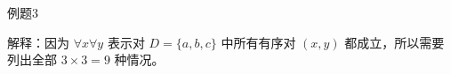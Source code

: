 \begin{question}{例题3}
\begin{enumerate}
	解释：因为 \(\forall x\forall y\) 表示对 \(D=\{a,b,c\}\) 中所有有序对 \((x,y)\) 都成立，所以需要列出全部 \(3\times 3=9\) 种情况。
\end{enumerate}

\end{question}

